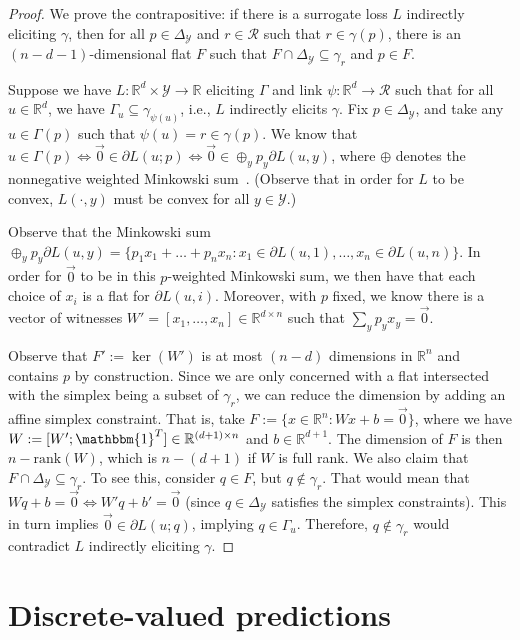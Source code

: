 \documentclass{article}
\newcommand{\reals}{\mathbb{R}}
\newcommand{\simplex}{\Delta_\Y}
\newcommand{\R}{\mathcal{R}}
\newcommand{\Y}{\mathcal{Y}}
\begin{document}
\begin{proof}[Proof]
	We prove the contrapositive: if there is a surrogate loss $L$ indirectly eliciting $\gamma$, then for all $p \in \simplex$ and $r \in \R$ such that $r \in \gamma(p)$, there is an $(n-d-1)$-dimensional flat $F$ such that $F \cap \simplex \subseteq \gamma_r$ and $p \in F$.
	
	Suppose we have $L:\reals^d \times \Y \to \reals$ eliciting $\Gamma$ and link $\psi : \reals^d \to \R$ such that for all $u \in \reals^d$, we have $\Gamma_u \subseteq \gamma_{\psi(u)}$, i.e., $L$ indirectly elicits $\gamma$.
	Fix $p \in \simplex$, and take any $u \in \Gamma(p)$ such that $\psi(u) = r \in \gamma(p)$.
	We know that $u \in \Gamma(p) \iff \vec 0 \in \partial L(u; p) \iff \vec 0 \in \oplus_y p_y \partial L(u,y)$, where $\oplus$ denotes the nonnegative weighted Minkowski sum~\cite[Theorem 4.1.1]{hiriart2012fundamentals}.  (Observe that in order for $L$ to be convex, $L(\cdot, y)$ must be convex for all $y \in \Y$.) 
	
	Observe that the Minkowski sum $\oplus_y p_y \partial L(u,y) = \{p_1 x_1 + \ldots + p_n x_n : x_1 \in \partial L(u,1), \ldots, x_n \in \partial L(u,n) \}$.
	In order for $\vec 0$ to be in this $p$-weighted Minkowski sum, we then have that each choice of $x_i$ is a flat for $\partial L(u, i)$.
	Moreover, with $p$ fixed, we know there is a vector of witnesses $W' = [x_1, \ldots, x_n] \in \reals^{d\times n}$ such that $\sum_y p_y x_y = \vec 0$.

	Observe that $F' := \ker(W')$ is at most $(n-d)$ dimensions in $\reals^n$ and contains $p$ by construction.
	Since we are only concerned with a flat intersected with the simplex being a subset of $\gamma_r$, we can reduce the dimension by adding an affine simplex constraint. 
	That is, take $F := \{x \in \reals^n : W x + b = \vec 0\}$, where we have $W := [W'; \mathbbm{1}^T] \in \reals^{(d+1) \times n}$ and $b \in \reals^{d+1}$.
	The dimension of $F$ is then $n - \mathrm{rank}(W)$, which is $n - (d+1)$ if $W$ is full rank.
	We also claim that $F \cap \simplex \subseteq \gamma_r$.
	To see this, consider $q \in F$, but $q \not \in \gamma_r$.
	That would mean that $Wq + b = \vec 0 \iff W'q + b' = \vec 0$ (since $q \in \simplex$ satisfies the simplex constraints).
	This in turn implies $\vec 0 \in \partial L(u;q)$, implying $q \in \Gamma_u$.
	Therefore, $q \not \in \gamma_r$ would contradict $L$ indirectly eliciting $\gamma$.
\end{proof}


\section{Discrete-valued predictions}\label{sec:finite-calib}
\end{document}
